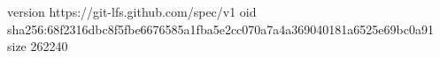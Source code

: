 version https://git-lfs.github.com/spec/v1
oid sha256:68f2316dbc8f5fbe6676585a1fba5e2cc070a7a4a369040181a6525e69bc0a91
size 262240
